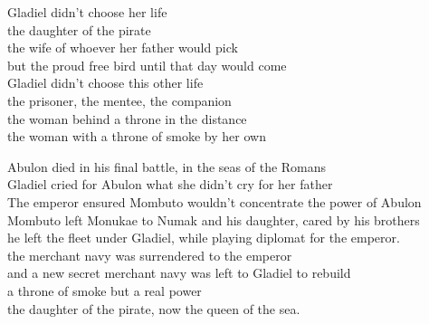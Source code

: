 \begin{lyrics}
Gladiel didn't choose her life\\
the daughter of the pirate\\
the wife of whoever her father would pick\\
but the proud free bird until that day would come\\
Gladiel didn't choose this other life\\
the prisoner, the mentee, the companion\\
the woman behind a throne in the distance\\
the woman with a throne of smoke by her own

Abulon died in his final battle, in the seas of the Romans\\
Gladiel cried for Abulon what she didn't cry for her father\\
The emperor ensured Mombuto wouldn't concentrate the power of Abulon\\
Mombuto left Monukae to Numak and his daughter, cared by his brothers\\
he left the fleet under Gladiel, while playing diplomat for the emperor.\\
the merchant navy was surrendered to the emperor\\
and a new secret merchant navy was left to Gladiel to rebuild\\
a throne of smoke but a real power\\
the daughter of the pirate, now the queen of the sea.
\end{lyrics}

